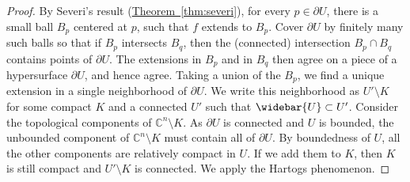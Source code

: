\documentclass[12pt,openany]{book}
\newcommand{\C}{{\mathbb{C}}}
\theoremstyle{plain}
\theoremstyle{remark}
\theoremstyle{definition}
\theoremstyle{exercise}
\theoremstyle{example}
\newcommand{\thmref}[1]{\hyperref[#1]{Theorem~\ref*{#1}}}
\begin{document}
\begin{proof}
By Severi's result (\thmref{thm:severi}), for every $p \in \partial U$,
there is a small ball $B_p$ centered at $p$,
such that $f$ extends to $B_p$.  Cover $\partial
U$ by finitely many such balls so that if $B_p$ intersects $B_q$, then
the (connected) intersection $B_p \cap B_q$ contains points of $\partial U$.
The extensions in $B_p$ and in $B_q$ then agree on a piece of a hypersurface
$\partial U$, and hence agree.  Taking a union of the $B_p$, we find
a unique extension in a single neighborhood of $\partial U$.
We write this neighborhood as $U' \setminus K$ for some compact $K$
and a connected $U'$ such that $\widebar{U} \subset U'$.
Consider the topological components of $\C^n \setminus K$.  As
$\partial U$ is connected and $U$ is bounded,
the unbounded component of $\C^n \setminus K$ must contain all of $\partial U$.
By boundedness of $U$, all the other components are
relatively compact in $U$.  If we add them to $K$, then $K$
is still compact and $U' \setminus K$ is connected.
We apply the Hartogs phenomenon.
\end{proof}
\end{document}
